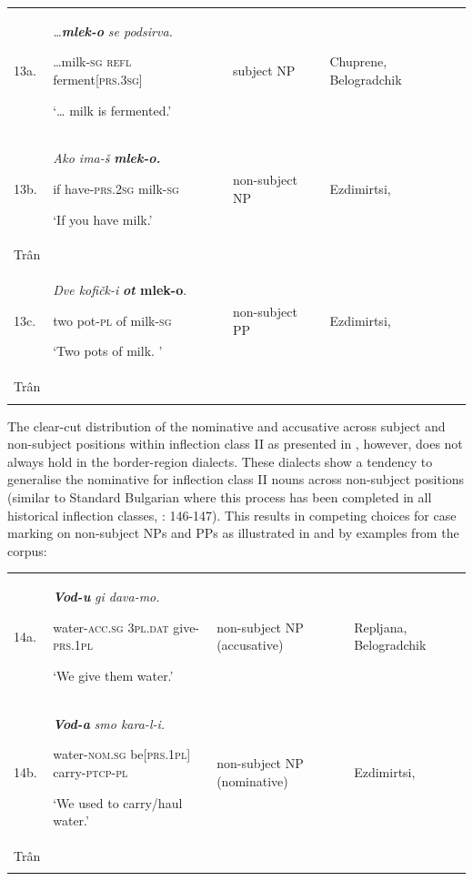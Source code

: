 \documentclass[output=paper]{langscibook}
\begin{document}
\begin{tabularx}{\textwidth}{XXXX}

\lsptoprule
13a. & \textit{…}\textbf{\textit{mlek-o}} \textit{se     podsirva.}

…milk-\textsc{sg}     \textsc{refl}  ferment\textsc{[prs.3sg]}

‘… milk is fermented.’  & subject NP & Chuprene,                                               Belogradchik\\
13b. & \textit{Ako ima-š} \textbf{\textit{mlek-o.}}

if      have-\textsc{prs.2sg}    milk-\textsc{sg}  

‘If you have milk.’ & non-subject NP & Ezdimirtsi,                                                                                                              \\
Trân\\
13c. & \textit{Dve    kofičk-i} \textbf{\textit{ot}    \textbf{mlek-o}}.

two    pot-\textsc{pl}         of     milk-\textsc{sg}  

‘Two pots of milk. ’ & non-subject PP & Ezdimirtsi,                                                                                                              \\
Trân\\
\lspbottomrule
\end{tabularx}
The clear-cut distribution of the nominative and accusative across subject and non-subject positions within inflection class II as presented in , however, does not always hold in the border-region dialects. These dialects show a tendency to generalise the nominative for inflection class II nouns across non-subject positions (similar to Standard Bulgarian where this process has been completed in all historical inflection classes, \citealt{Mirčev1958}: 146-147). This results in competing choices for case marking on non-subject NPs and PPs as illustrated in  and  by examples from the corpus: 


\begin{tabularx}{\textwidth}{XXXX}

\lsptoprule
14a. & \textbf{\textit{Vod-u}} \textit{gi               dava-mo.} 

water-\textsc{acc.sg}  \textsc{3pl.dat}      give-\textsc{prs.1pl}     

‘We give them water.’ & non-subject NP (accusative) & Repljana,                                               Belogradchik\\
14b. & \textbf{\textit{Vod-a}                }\textit{smo                  kara-l-i.} 

water-\textsc{nom.sg}     be\textsc{[prs.1pl]}      carry-\textsc{ptcp-pl}  

‘We used to carry/haul water.’ & non-subject NP (nominative) & Ezdimirtsi,                                                                                                              \\
Trân\\
\lspbottomrule
\end{tabularx}
\end{document}
